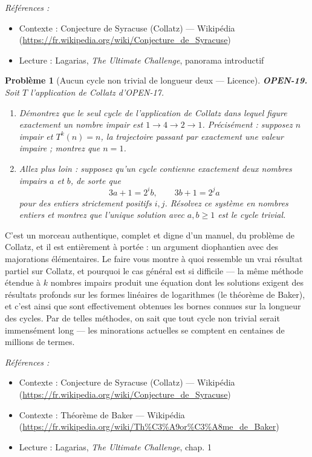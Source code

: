 \documentclass[11pt]{article}
\newtheorem{problem}{Problème}
\newenvironment{refs}{\par\small\noindent\emph{Références :}\begin{itemize}\setlength\itemsep{0pt}}{\end{itemize}\normalsize}
\begin{document}
\begin{refs}
\item Contexte : Conjecture de Syracuse (Collatz) --- Wikipédia (\url{https://fr.wikipedia.org/wiki/Conjecture_de_Syracuse})
\item Lecture : Lagarias, \textit{The Ultimate Challenge}, panorama introductif
\end{refs}

\bigskip

\begin{problem}[{Aucun cycle non trivial de longueur deux --- Licence}]
\textbf{OPEN-19.} Soit $ T $ l'application de Collatz d'OPEN-17.
\begin{enumerate}
\item[(a)] Démontrez que le seul cycle de l'application de Collatz dans lequel figure exactement
un nombre impair est $ 1 \to 4 \to 2 \to 1 $. Précisément : supposez $ n $ impair et
$ T^{k}(n) = n $, la trajectoire passant par exactement une valeur impaire ; montrez que
$ n = 1 $.
\item[(b)] Allez plus loin : supposez qu'un cycle contienne exactement deux nombres impairs
$ a $ et $ b $, de sorte que
\[ 3a+1 = 2^{i} b, \qquad 3b+1 = 2^{j} a \]
pour des entiers strictement positifs $ i, j $. Résolvez ce système en nombres entiers
et montrez que l'unique solution avec $ a, b \geq 1 $ est le cycle trivial.
\end{enumerate}

\end{problem}

\noindent C'est un morceau authentique, complet et digne d'un manuel, du problème
de Collatz, et il est entièrement à portée : un argument diophantien avec des majorations
élémentaires. Le faire vous montre à quoi ressemble un vrai résultat partiel sur Collatz,
et pourquoi le cas général est si difficile --- la même méthode étendue à $ k $ nombres
impairs produit une équation dont les solutions exigent des résultats profonds sur les
formes linéaires de logarithmes (le théorème de Baker), et c'est ainsi que sont
effectivement obtenues les bornes connues sur la longueur des cycles. Par de telles
méthodes, on sait que tout cycle non trivial serait immensément long --- les minorations
actuelles se comptent en centaines de millions de termes.

\begin{refs}
\item Contexte : Conjecture de Syracuse (Collatz) --- Wikipédia (\url{https://fr.wikipedia.org/wiki/Conjecture_de_Syracuse})
\item Contexte : Théorème de Baker --- Wikipédia (\url{https://fr.wikipedia.org/wiki/Th%C3%A9or%C3%A8me_de_Baker})
\item Lecture : Lagarias, \textit{The Ultimate Challenge}, chap. 1
\end{refs}
\end{document}
